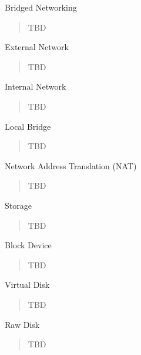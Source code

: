 Bridged Networking

\begin{quote}
TBD
\end{quote}

External Network

\begin{quote}
TBD
\end{quote}

Internal Network

\begin{quote}
TBD
\end{quote}

Local Bridge

\begin{quote}
TBD
\end{quote}

Network Address Translation (NAT)

\begin{quote}
TBD
\end{quote}

Storage

\begin{quote}
TBD
\end{quote}

Block Device

\begin{quote}
TBD
\end{quote}

Virtual Disk

\begin{quote}
TBD
\end{quote}

Raw Disk

\begin{quote}
TBD
\end{quote}

